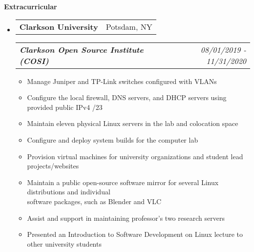 \documentclass[letterpaper,11pt]{article}
\makeatletter
\newcommand{\resitem}[1]{\item #1 \vspace{-3pt}}
\newcommand{\resheading}[1]{{\large {\textbf{#1 \vphantom{p\^{E}}}}}\vspace{-3pt}}
\newcommand{\topheading}[2]{
\begin{tabular*}{6.5in}{l@{\extracolsep{\fill}}r}
		\textbf{#1} & #2 \\
\end{tabular*}}
\newcommand{\bottomheading}[2]{
\begin{tabular*}{6.5in}{l@{\extracolsep{\fill}}r}
		\textit{\textbf{#1}} & \textit{#2} \\
\end{tabular*}\vspace{-6pt}}
\makeatother
\begin{document}

\resheading{Extracurricular}
\begin{itemize}
\item[]
\topheading{Clarkson University}{Potsdam, NY}
\bottomheading{Clarkson Open Source Institute (COSI)}{08/01/2019 - 11/31/2020}
\begin{itemize}
        \resitem{Manage Juniper and TP-Link switches configured with VLANs}
        \resitem{Configure the local firewall, DNS servers, and DHCP servers using provided public IPv4 /23}
        \resitem{Maintain eleven physical Linux servers in the lab and colocation space}
        \resitem{Configure and deploy system builds for the computer lab}
        \resitem{Provision virtual machines for university organizations and student lead projects/websites}
        \resitem{Maintain a public open-source software mirror for several Linux distributions and individual \\\quad software packages, such as Blender and VLC}
        \resitem{Assist and support in maintaining professor's two research servers}
        \resitem{Presented an Introduction to Software Development on Linux lecture to other university students}
\end{itemize}

\end{itemize}
\end{document}
